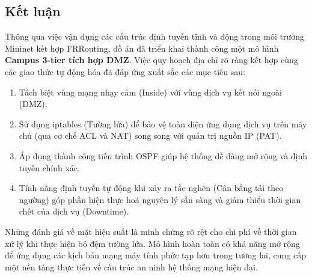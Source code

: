 \subsection{Kết luận}
Thông qua việc vận dụng các cấu trúc định tuyến tĩnh và động trong môi trường Mininet kết hợp FRRouting, đồ án đã triển khai thành công một mô hình \textbf{Campus 3-tier tích hợp DMZ}. Việc quy hoạch địa chỉ rõ ràng kết hợp cùng các giao thức tự động hóa đã đáp ứng xuất sắc các mục tiêu sau:
\begin{enumerate}
    \item Tách biệt vùng mạng nhạy cảm (Inside) với vùng dịch vụ kết nối ngoài (DMZ).
    \item Sử dụng iptables (Tường lửa) để bảo vệ toàn diện ứng dụng dịch vụ trên máy chủ (qua cơ chế ACL và NAT) song song với quản trị nguồn IP (PAT).
    \item Áp dụng thành công tiến trình OSPF giúp hệ thống dễ dàng mở rộng và định tuyến chính xác.
    \item Tính năng định tuyến tự động khi xảy ra tắc nghẽn (Cân bằng tải theo ngưỡng) góp phần hiện thực hoá nguyên lý sẵn sàng và giảm thiểu thời gian chết của dịch vụ (Downtime).
\end{enumerate}

Những đánh giá về mặt hiệu suất là minh chứng rõ rệt cho chi phí về thời gian xử lý khi thực hiện bộ đệm tường lửa. Mô hình hoàn toàn có khả năng mở rộng để ứng dụng các kịch bản mạng máy tính phức tạp hơn trong tương lai, cung cấp một nền tảng thực tiễn về cấu trúc an ninh hệ thống mạng hiện đại.
